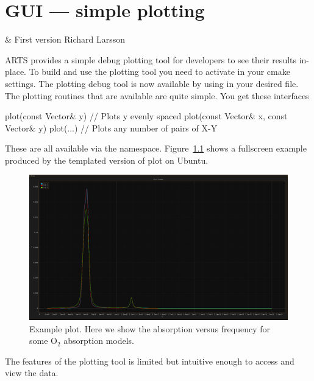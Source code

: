 \chapter{GUI --- simple plotting}
 \label{sec:gui}


  & First version Richard Larsson
 \stophistory

 ARTS provides a simple debug plotting tool for developers to see their results in-place.
 To build and use the plotting tool you need to activate  in
 your cmake settings.  The plotting debug tool is now available by using
  in your desired file.  The plotting routines that
 are available are quite simple.  You get these interfaces
 
\begin{code}
  plot(const Vector& y)  // Plots y evenly spaced
  plot(const Vector& x, const Vector& y)
  plot(...)  // Plots any number of pairs of X-Y
\end{code}

These are all available via the  namespace.
Figure~\ref{fig:debug_gui_test_gui} shows a fullscreen example produced
by the templated version of plot on Ubuntu.
\begin{figure}[ht!]
 \centering
 \includegraphics[width=\textwidth]{Figs/debug_gui/test_gui.png}
 \caption{Example plot.  Here we show the absorption versus frequency for some
 O$_2$ absorption models.}
 \label{fig:debug_gui_test_gui}
\end{figure}

The features of the plotting tool is limited but intuitive enough to access and
view the data.

